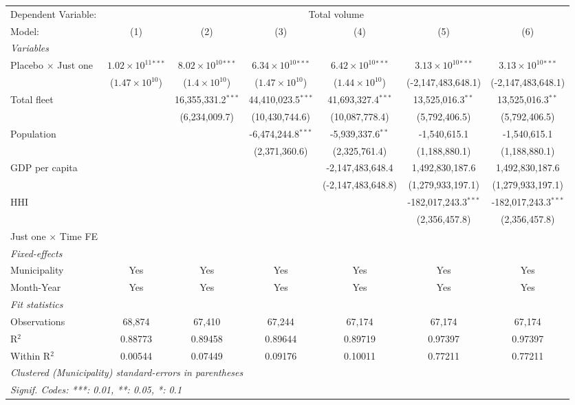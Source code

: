\documentclass[
]{article}
\begin{document}
\begin{tabular}{lcccccc}
\tabularnewline\midrule\midrule
Dependent Variable:&\multicolumn{6}{c}{Total volume}\\
Model:&(1) & (2) & (3) & (4) & (5) & (6)\\
\midrule \emph{Variables}&   &   &   &   &   &  \\
Placebo $\times $ Just one & $1.02\times 10^{11}$$^{***}$ & $8.02\times 10^{10}$$^{***}$ & $6.34\times 10^{10}$$^{***}$ & $6.42\times 10^{10}$$^{***}$ & $3.13\times 10^{10}$$^{***}$ & $3.13\times 10^{10}$$^{***}$\\
  &($1.47\times 10^{10}$) & ($1.4\times 10^{10}$) & ($1.47\times 10^{10}$) & ($1.44\times 10^{10}$) & (-2,147,483,648.1) & (-2,147,483,648.1)\\
Total fleet &    & 16,355,331.2$^{***}$ & 44,410,023.5$^{***}$ & 41,693,327.4$^{***}$ & 13,525,016.3$^{**}$ & 13,525,016.3$^{**}$\\
  &   & (6,234,009.7) & (10,430,744.6) & (10,087,778.4) & (5,792,406.5) & (5,792,406.5)\\
Population &    &    & -6,474,244.8$^{***}$ & -5,939,337.6$^{**}$ & -1,540,615.1 & -1,540,615.1\\
  &   &    & (2,371,360.6) & (2,325,761.4) & (1,188,880.1) & (1,188,880.1)\\
GDP per capita &    &    &    & -2,147,483,648.4 & 1,492,830,187.6 & 1,492,830,187.6\\
  &   &    &    & (-2,147,483,648.8) & (1,279,933,197.1) & (1,279,933,197.1)\\
HHI &    &    &    &    & -182,017,243.3$^{***}$ & -182,017,243.3$^{***}$\\
  &   &    &    &    & (2,356,457.8) & (2,356,457.8)\\
Just one $\times$ Time FE &  &  &  &  &  & \\
\midrule \emph{Fixed-effects}&   &   &   &   &   &  \\
Municipality & Yes & Yes & Yes & Yes & Yes & Yes\\
Month-Year & Yes & Yes & Yes & Yes & Yes & Yes\\
\midrule \emph{Fit statistics}&  & & & & & \\
Observations & 68,874&67,410&67,244&67,174&67,174&67,174\\
R$^2$ & 0.88773&0.89458&0.89644&0.89719&0.97397&0.97397\\
Within R$^2$ & 0.00544&0.07449&0.09176&0.10011&0.77211&0.77211\\
\midrule\midrule\multicolumn{7}{l}{\emph{Clustered (Municipality) standard-errors in parentheses}}\\
\multicolumn{7}{l}{\emph{Signif. Codes: ***: 0.01, **: 0.05, *: 0.1}}\\
\end{tabular}
\end{document}
